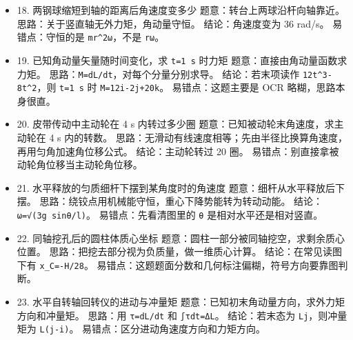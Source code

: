 \documentclass[12pt,a4paper]{ctexart}
\begin{document}
\begin{itemize}

\item 18. 两钢球缩短到轴的距离后角速度变多少 题意：转台上两球沿杆向轴靠近。 思路：关于竖直轴无外力矩，角动量守恒。 结论：角速度变为 36 rad/s。 易错点：守恒的是 \texttt{mr\textasciicircum{}2ω}，不是 \texttt{rω}。

\end{itemize}

\begin{itemize}

\item 19. 已知角动量矢量随时间变化，求 \texttt{t=1 s} 时力矩 题意：直接由角动量函数求力矩。 思路：\texttt{M=dL/dt}，对每个分量分别求导。 结论：若末项读作 \texttt{12t\textasciicircum{}3-8t\textasciicircum{}2}，则 \texttt{t=1 s} 时 \texttt{M=12i-2j+20k}。 易错点：这题主要是 OCR 略糊，思路本身很直。

\end{itemize}

\begin{itemize}

\item 20. 皮带传动中主动轮在 4 s 内转过多少圈 题意：已知被动轮末角速度，求主动轮在 4 s 内的转数。 思路：无滑动有线速度相等；先由半径比换算角速度，再用匀角加速角位移公式。 结论：主动轮转过 20 圈。 易错点：别直接拿被动轮角位移当主动轮角位移。

\end{itemize}

\begin{itemize}

\item 21. 水平释放的匀质细杆下摆到某角度时的角速度 题意：细杆从水平释放后下摆。 思路：绕铰点用机械能守恒，重心下降势能转为转动动能。 结论：\texttt{ω=√(3g sinθ/l)}。 易错点：先看清图里的 \texttt{θ} 是相对水平还是相对竖直。

\end{itemize}

\begin{itemize}

\item 22. 同轴挖孔后的圆柱体质心坐标 题意：圆柱一部分被同轴挖空，求剩余质心位置。 思路：把挖去部分视为负质量，做一维质心计算。 结论：在常见读图下有 \texttt{x\_C=-H/28}。 易错点：这题题面分数和几何标注偏糊，符号方向要靠图判断。

\end{itemize}

\begin{itemize}

\item 23. 水平自转轴回转仪的进动与冲量矩 题意：已知初末角动量方向，求外力矩方向和冲量矩。 思路：用 \texttt{τ=dL/dt} 和 \texttt{∫τdt=ΔL}。 结论：若末态为 \texttt{Lj}，则冲量矩为 \texttt{L(j-i)}。 易错点：区分进动角速度方向和力矩方向。

\end{itemize}
\end{document}
